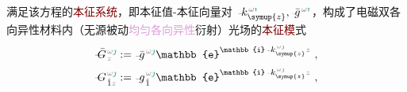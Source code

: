 满足该方程的\textcolor{Maroon}{本征系统}，即\textcolor{PineGreen}{本征值}-\textcolor{PineGreen}{本征向量}对 $\Xint{\begin{smallmatrix} ~ \\ {}^{}_{\mathcolor{gray}{-}} \\ ~ \end{smallmatrix}}{15}{k}_{\symup{z}}^{\;\! \mathcolor{gray}{\omega} \textcolor{PineGreen}{\imath}}, \Xint{{}^{}_{\mathcolor{gray}{-}}}{10}{\bar{g}}^{\;\!\mathcolor{gray}{\omega} \textcolor{PineGreen}{\imath}}$，构成了电磁\textcolor{PineGreen}{双各向异性}材料内（\textcolor{NavyBlue}{无源}\textcolor{NavyBlue}{被动}\textcolor{Plum}{均匀}\textcolor{Plum}{各向异性}衍射）光场的\textcolor{Maroon}{本征模}式
\begin{subequations} \label{eq:polar_phase}
	\begin{align}
		\Xint{\mathcolor{gray}{-}}{20}{\bar{G}}^{\;\!\mathcolor{gray}{\omega} \textcolor{PineGreen}{\jmath}}_{\;\! \mathcolor{gray}{z}} &:= \Xint{{}^{}_{\mathcolor{gray}{-}}}{10}{\bar{g}}^{\;\!\mathcolor{gray}{\omega} \textcolor{PineGreen}{\jmath}} \mathbb{e}^{\mathbb{i} \Xint{\begin{smallmatrix} ~ \\ {}^{}_{\mathcolor{gray}{-}} \\ ~ \end{smallmatrix}}{15}{k}_{\symup{z}}^{\;\! \mathcolor{gray}{\omega} \textcolor{PineGreen}{\jmath}} \mathcolor{gray}{z}} ~, \label{eq:vec-polar_phase} \\
		\Xint{\mathcolor{gray}{-}}{20}{G}^{\;\!\mathcolor{gray}{\omega} \textcolor{PineGreen}{\jmath}}_{\;\! \hat{1} \mathcolor{gray}{z}} &:= \Xint{{}^{}_{\mathcolor{gray}{-}}}{10}{g}^{\;\!\mathcolor{gray}{\omega} \textcolor{PineGreen}{\jmath}}_{\;\! \hat{1}} \mathbb{e}^{\mathbb{i} \Xint{\begin{smallmatrix} ~ \\ {}^{}_{\mathcolor{gray}{-}} \\ ~ \end{smallmatrix}}{15}{k}_{\symup{z}}^{\;\! \mathcolor{gray}{\omega} \textcolor{PineGreen}{\jmath}} \mathcolor{gray}{z}} ~, \label{eq:components-polar_phase}
	\end{align}
\end{subequations}
